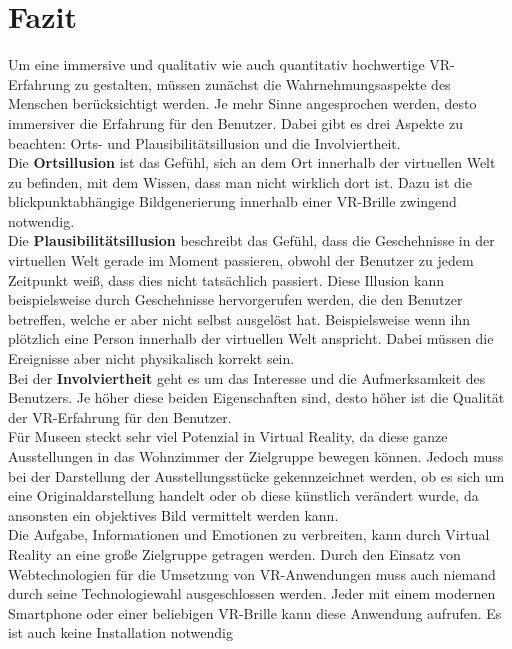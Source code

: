 \documentclass[a4paper,12pt,oneside]{article}
\begin{document}
  \section{Fazit}
    Um eine immersive und qualitativ wie auch quantitativ hochwertige 
    VR-Erfahrung zu gestalten, müssen zunächst die Wahrnehmungsaspekte
    des Menschen berücksichtigt werden. Je mehr Sinne angesprochen werden,
    desto immersiver die Erfahrung für den Benutzer. Dabei gibt es drei
    Aspekte zu beachten: Orts- und Plausibilitätsillusion
    und die Involviertheit. \\
    Die \textbf{Ortsillusion} ist das Gefühl, sich an dem Ort innerhalb
    der virtuellen Welt zu befinden, mit dem Wissen, dass man nicht wirklich
    dort ist. Dazu ist die blickpunktabhängige Bildgenerierung innerhalb
    einer VR-Brille zwingend notwendig. \\
    Die \textbf{Plausibilitätsillusion} beschreibt das Gefühl, dass die
    Geschehnisse in der virtuellen Welt gerade im Moment passieren, 
    obwohl der Benutzer zu jedem Zeitpunkt weiß, dass dies nicht
    tatsächlich passiert. Diese Illusion kann beispielsweise durch
    Geschehnisse hervorgerufen werden, die den Benutzer betreffen, welche
    er aber nicht selbst ausgelöst hat. Beispielsweise wenn ihn plötzlich
    eine Person innerhalb der virtuellen Welt anspricht. Dabei müssen
    die Ereignisse aber nicht physikalisch korrekt sein. \\
    Bei der \textbf{Involviertheit} geht es um das Interesse und die 
    Aufmerksamkeit des Benutzers. Je höher diese beiden Eigenschaften sind,
    desto höher ist die Qualität der VR-Erfahrung für den Benutzer. \\
    Für Museen steckt sehr viel Potenzial in Virtual Reality, da diese
    ganze Ausstellungen in das Wohnzimmer der Zielgruppe bewegen können.
    Jedoch muss bei der Darstellung der Ausstellungsstücke gekennzeichnet
    werden, ob es sich um eine Originaldarstellung handelt oder ob diese
    künstlich verändert wurde, da ansonsten ein objektives Bild vermittelt
    werden kann. \\
    Die Aufgabe, Informationen und Emotionen zu verbreiten, kann durch
    Virtual Reality an eine große Zielgruppe getragen werden. Durch den
    Einsatz von Webtechnologien für die Umsetzung von VR-Anwendungen 
    muss auch niemand durch seine Technologiewahl ausgeschlossen werden.
    Jeder mit einem modernen Smartphone oder einer beliebigen VR-Brille kann
    diese Anwendung aufrufen. Es ist auch keine Installation notwendig
\end{document}
